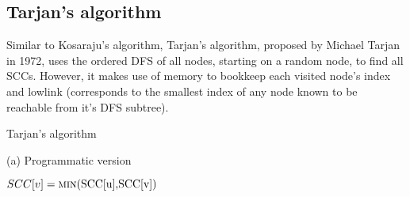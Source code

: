 \subsection{Tarjan's algorithm} \label{algorithm-scc-tarjan}
Similar to Kosaraju's algorithm, Tarjan's algorithm, proposed by Michael Tarjan in 1972, \cite{tarjan72} uses the ordered DFS of all nodes, starting on a random node, to find all SCCs. However, it makes use of memory to bookkeep each visited node's index and lowlink (corresponds to the smallest index of any node known to be reachable from it's DFS subtree). 
\begin{center}
    \begin{algorithm}[H]
        \caption{Tarjan's algorithm}
        \label{alg-tarjan}
        \begin{minipage}[t]{0.80\linewidth}
            (a) Programmatic version
            \begin{algorithmic}[1]


                         {}
                        \EndIf
                         {$SCC[v] = \Call{min}{$SCC[u]$, $SCC[v]$}$}
                        \EndIf
                    \EndFor

                        \EndWhile
                    \EndIf
                \EndFunction

                    \EndFor
                        \EndIf
                    \EndFor
                    \State {}
                \EndFunction
            \end{algorithmic}
        \end{minipage}
    \end{algorithm}
\end{center}
